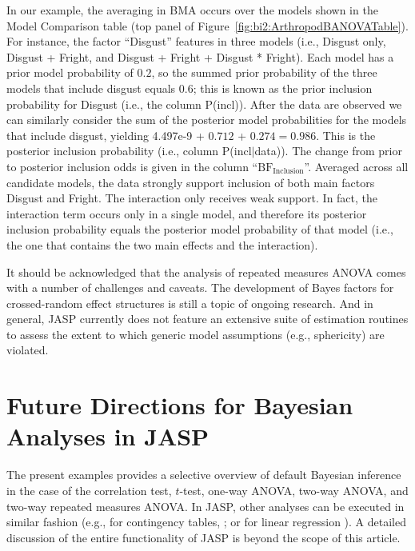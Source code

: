 In our example, the averaging in BMA occurs over the models shown in the Model Comparison table (top panel of Figure~\ref{fig:bi2:ArthropodBANOVATable}). For instance, the factor ``Disgust'' features in three models (i.e., Disgust only, Disgust + Fright, and Disgust + Fright + Disgust * Fright). Each model has a prior model probability of $0.2$, so the summed prior probability of the three models that include disgust equals $0.6$; this is known as the prior inclusion probability for Disgust (i.e., the column P(incl)). After the data are observed we can similarly consider the sum of the posterior model probabilities for the models that include disgust, yielding 4.497e-9 + $0.712$ + $0.274 = 0.986$. This is the posterior inclusion probability (i.e., column P(incl$|$data)). The change from prior to posterior inclusion odds is given in the column ``$\text{BF}_\text{Inclusion}$''. Averaged across all candidate models, the data strongly support inclusion of both main factors Disgust and Fright. The interaction only receives weak support. In fact, the interaction term occurs only in a single model, and therefore its posterior inclusion probability equals the posterior model probability of that model (i.e., the one that contains the two main effects and the interaction).

It should be acknowledged that the analysis of repeated measures ANOVA comes with a number of challenges and caveats. The development of Bayes factors for crossed-random effect structures is still a topic of ongoing research. And in general, JASP currently does not feature an extensive suite of estimation routines to assess the extent to which generic model assumptions (e.g., sphericity) are violated.

\section{Future Directions for Bayesian Analyses in JASP}
The present examples provides a selective overview of default Bayesian inference in the case of the correlation test, $t$-test, one-way ANOVA, two-way ANOVA, and two-way repeated measures ANOVA. In JASP, other analyses can be executed in similar fashion (e.g., for contingency tables, ; or for linear regression ). A detailed discussion of the entire functionality of JASP is beyond the scope of this article.

